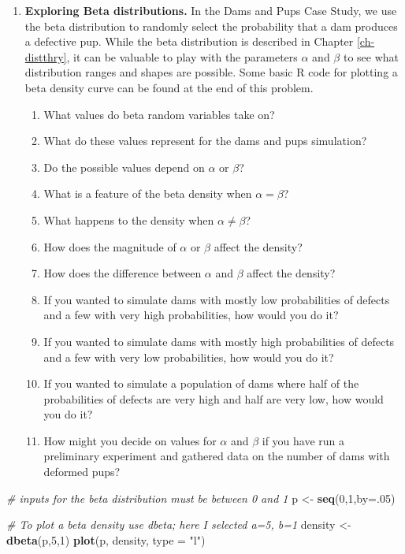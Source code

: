 \documentclass[
]{krantz}
\newenvironment{Shaded}{\begin{snugshade}}{\end{snugshade}}
\newcommand{\AttributeTok}[1]{\textcolor[rgb]{0.27,0.27,0.27}{#1}}
\newcommand{\CommentTok}[1]{\textcolor[rgb]{0.37,0.37,0.37}{\textit{#1}}}
\newcommand{\DecValTok}[1]{\textcolor[rgb]{0.06,0.06,0.06}{#1}}
\newcommand{\FunctionTok}[1]{\textcolor[rgb]{0.27,0.27,0.27}{\textbf{#1}}}
\newcommand{\NormalTok}[1]{#1}
\newcommand{\OtherTok}[1]{\textcolor[rgb]{0.37,0.37,0.37}{#1}}
\newcommand{\StringTok}[1]{\textcolor[rgb]{0.5,0.5,0.5}{#1}}
\providecommand{\tightlist}{%
  \setlength{\itemsep}{0pt}\setlength{\parskip}{0pt}}
\begin{document}
\begin{enumerate}
\def\labelenumi{\arabic{enumi}.}
\item
  \textbf{Exploring Beta distributions.} In the Dams and Pups Case Study, we use the beta distribution to randomly select the probability that a dam produces a defective pup. While the beta distribution is described in Chapter \ref{ch-distthry}, it can be valuable to play with the parameters \(\alpha\) and \(\beta\) to see what distribution ranges and shapes are possible. Some basic R code for plotting a beta density curve can be found at the end of this problem.

  \begin{enumerate}
  \def\labelenumii{\alph{enumii}.}
  \tightlist
  \item
    What values do beta random variables take on?
  \item
    What do these values represent for the dams and pups simulation?
  \item
    Do the possible values depend on \(\alpha\) or \(\beta\)?
  \item
    What is a feature of the beta density when \(\alpha=\beta\)?
  \item
    What happens to the density when \(\alpha \neq \beta\)?
  \item
    How does the magnitude of \(\alpha\) or \(\beta\) affect the density?
  \item
    How does the difference between \(\alpha\) and \(\beta\) affect the density?
  \item
    If you wanted to simulate dams with mostly low probabilities of defects and a few with very high probabilities, how would you do it?
  \item
    If you wanted to simulate dams with mostly high probabilities of defects and a few with very low probabilities, how would you do it?
  \item
    If you wanted to simulate a population of dams where half of the probabilities of defects are very high and half are very low, how would you do it?
  \item
    How might you decide on values for \(\alpha\) and \(\beta\) if you have run a preliminary experiment and gathered data on the number of dams with deformed pups?
  \end{enumerate}
\end{enumerate}

\begin{Shaded}
\begin{Highlighting}[]
\CommentTok{\# inputs for the beta distribution must be between 0 and 1}
\NormalTok{p }\OtherTok{\textless{}{-}} \FunctionTok{seq}\NormalTok{(}\DecValTok{0}\NormalTok{,}\DecValTok{1}\NormalTok{,}\AttributeTok{by=}\NormalTok{.}\DecValTok{05}\NormalTok{)  }

\CommentTok{\# To plot a beta density use dbeta; here I selected a=5, b=1}
\NormalTok{density }\OtherTok{\textless{}{-}} \FunctionTok{dbeta}\NormalTok{(p,}\DecValTok{5}\NormalTok{,}\DecValTok{1}\NormalTok{)}
\FunctionTok{plot}\NormalTok{(p, density, }\AttributeTok{type =} \StringTok{"l"}\NormalTok{)}
\end{Highlighting}
\end{Shaded}
\end{document}

